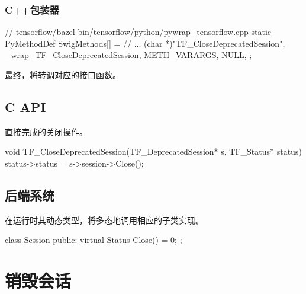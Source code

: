 \begin{content}
\subsubsection{C++包装器}

\begin{leftbar}
\begin{c++}
// tensorflow/bazel-bin/tensorflow/python/pywrap\_tensorflow.cpp
static PyMethodDef SwigMethods[] = {
  // ...
  { (char *)"TF_CloseDeprecatedSession", 
    _wrap_TF_CloseDeprecatedSession, METH_VARARGS, NULL},
};
\end{c++}
\end{leftbar}

最终，将转调对应的接口函数。

\subsection{C API}

直接完成的关闭操作。

\begin{leftbar}
\begin{c++}
void TF_CloseDeprecatedSession(TF_DeprecatedSession* s, TF_Status* status) {
  status->status = s->session->Close();
}
\end{c++}
\end{leftbar}

\subsection{后端系统}

在运行时其动态类型，将多态地调用相应的子类实现。

\begin{leftbar}
\begin{c++}
class Session {
public:
  virtual Status Close() = 0;
};
\end{c++}
\end{leftbar}

\end{content}

\section{销毁会话}

